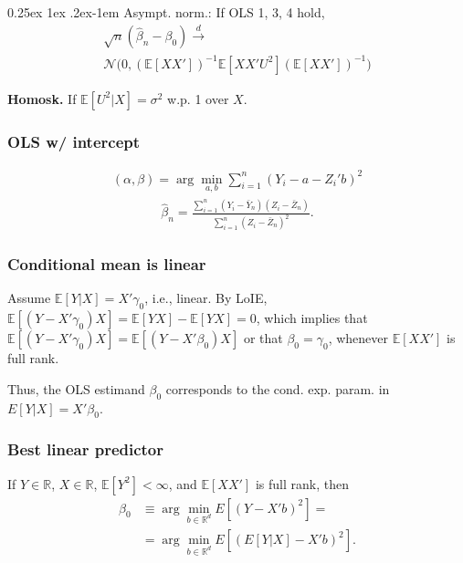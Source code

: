 \documentclass[9pt]{extarticle}
\makeatletter
\newcommand{\RR}{\mathbb{R}}
\newcommand{\EE}{\mathbb{E}}
\newcommand{\hbeta}{\hat{\beta}}
\renewcommand{\paragraph}{%
  \@startsection{paragraph}{4}%
  {\z@}{0.25ex \@plus 1ex \@minus .2ex}{-1em}%
  {\normalfont\normalsize\bfseries}%
}
\newcommand{\darrow}{\overset{d}{\rightarrow}}
\newenvironment{noshow}{}{}
\makeatother
\begin{document}
\begin{multicols*}{4}
\begin{noshow}
\paragraph{Asympt. norm.:} If OLS 1, 3, 4 hold,
\begin{gather*}
    \sqrt{n}(\hbeta_n - \beta_0) \darrow \\ \mathcal{N}\big(0, (\EE[XX'])^{-1}\EE[XX' U^2](\EE[XX'])^{-1} \big)
\end{gather*}

\textbf{Homosk.} If $\EE[U^2 | X] = \sigma^2$ w.p. 1 over $X$.

\subsubsection*{OLS w/ intercept}
\begin{align*}
    (\alpha, \beta) = \arg \min_{a, b} \sum_{i=1}^n (Y_i - a - Z_i'b)^2
\end{align*}
\begin{align*}
    \hbeta_n = \frac{\sum_{i=1}^n (Y_i - \bar{Y}_n)(Z_i - \bar{Z}_n)}{\sum_{i=1}^n (Z_i - \bar{Z}_n)^2}.
\end{align*}



\subsubsection*{Conditional mean is linear}
Assume $\EE[Y | X] =X'\gamma_{0}$, i.e., linear. By LoIE, $\EE[(Y-X'\gamma_{0})X] = \EE[YX]-\EE[YX]=0$, which implies that $\EE\left[\left(Y-X'\gamma_{0}\right)X\right]=\EE\left[\left(Y-X'\beta_{0}\right)X\right]$ or that $\beta_{0}=\gamma_{0}$, whenever $\EE\left[XX'\right]$ is full rank.

Thus, the OLS estimand $\beta_{0}$ corresponds to the cond. exp. param. in $E\left[Y|X\right]=X'\beta_{0}$.

\subsubsection*{Best linear predictor}
If $Y\in \RR$, $X\in \RR$, $\EE[Y^{2}] < \infty$, and $\EE[XX']$ is full rank, then \begin{align*}
    \beta_{0} &\equiv\arg\underset{b\in\mathbb{R}^{d}}{\min}E\left[\left(Y-X'b\right)^{2}\right] = \\
    &=\arg\underset{b\in\mathbb{R}^{d}}{\min}E\left[\left(E\left[Y|X\right]-X'b\right)^{2}\right].
\end{align*}


\end{noshow}
\end{multicols*}
\end{document}

